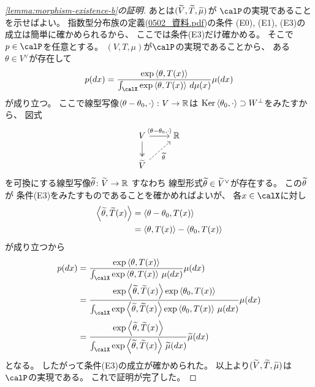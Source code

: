 \documentclass[report]{jlreq}
\begin{document}
\begin{proof}[\cref{lemma:morphism-existence-b}の証明]
    あとは$(\widetilde{V}, \widetilde{T}, \widetilde{\mu})$が
    $\calP$の実現であることを示せばよい。
    指数型分布族の定義(\url{0502_資料.pdf})の条件
    (E0), (E1), (E3)の成立は簡単に確かめられるから、
    ここでは条件(E3)だけ確かめる。
    そこで$p \in \calP$を任意とする。
    $(V, T, \mu)$が$\calP$の実現であることから、
    ある$\theta \in V^\vee$が存在して
    \begin{equation}
        p(dx) =
            \frac{
                \exp\myangle{\theta}{T(x)}
            }{
                \int_\calX \exp\myangle{\theta}{T(x)} \, d\mu(x)
            }
            \mu(dx)
    \end{equation}
    が成り立つ。
    ここで線型写像$\left\langle{\theta - \theta_0},{\cdot}\right\rangle \colon V \to \mathbb{R}$は
    $\operatorname{\mathrm{Ker}} \left\langle{\theta_0},{\cdot}\right\rangle \supset W^\perp$をみたすから、
    図式
    \begin{equation}
        \begin{tikzcd}
            V
                \ar[two heads]{d}
                \ar{r}{\myangle{\theta - \theta_0}{\cdot}}
                & \R
                \\
            \wt{V}
                \ar[dashed]{ru}[swap]{\wt{\theta}}
        \end{tikzcd}
    \end{equation}
    を可換にする線型写像$\widetilde{\theta} \colon \widetilde{V} \to \mathbb{R}$
    すなわち
    線型形式$\widetilde{\theta} \in \widetilde{V}^\vee$が存在する。
    この$\widetilde{\theta}$が
    条件(E3)をみたすものであることを確かめればよいが、
    各$x \in \calX$に対し
    \begin{alignat}{1}
        \left\langle{\widetilde{\theta}},{\widetilde{T}(x)}\right\rangle
            &=
                \left\langle{\theta - \theta_0},{T(x)}\right\rangle
                \\
            &=
                \left\langle{\theta},{T(x)}\right\rangle
                -
                \left\langle{\theta_0},{T(x)}\right\rangle
    \end{alignat}
    が成り立つから
    \begin{alignat}{1}
        p(dx)
            &=
                \frac{
                    \exp\myangle{\theta}{T(x)}
                }{
                    \int_\calX
                    \exp\myangle{\theta}{T(x)}
                    \, \mu(dx)
                }
                \mu(dx)
                \\
            &=
                \frac{
                    \exp\myangle{\wt{\theta}}{\wt{T}(x)}
                    \exp\myangle{\theta_0}{T(x)}
                }{
                    \int_\calX 
                    \exp\myangle{\wt{\theta}}{\wt{T}(x)}
                    \exp\myangle{\theta_0}{T(x)}
                    \, \mu(dx)
                }
                \mu(dx)
                \\
            &=
                \frac{
                    \exp\myangle{\wt{\theta}}{\wt{T}(x)}
                }{
                    \int_\calX
                    \exp\myangle{\wt{\theta}}{\wt{T}(x)}
                    \, \wt{\mu}(dx)
                }
                \wt{\mu}(dx)
    \end{alignat}
    となる。
    したがって条件(E3)の成立が確かめられた。
    以上より$(\widetilde{V}, \widetilde{T}, \widetilde{\mu})$は$\calP$の実現である。
    これで証明が完了した。
\end{proof}
\end{document}
